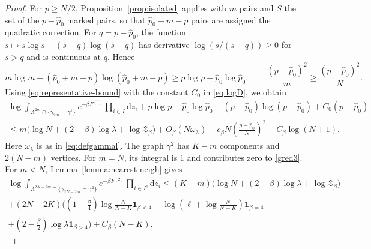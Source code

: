 \documentclass[a4paper,10pt,leqno]{amsart}
\numberwithin{equation}{section}
\newcommand{\dd}{\mathrm{d}}
\def\mc{\mathcal}
\def\indic{\mathbf{1}}
\begin{document}
\begin{proof}
  For $p\ge N/2$, Proposition~\ref{prop:isolated} applies with $m$ pairs and $S$ the set of the $p-\widehat p_0$ marked pairs, so that $\widehat p_0+m-p$ pairs are assigned the quadratic correction. For $q=p-\widehat p_0$, the function $s\mapsto s\log s-(s-q)\log(s-q)$ has derivative $\log(s/(s-q))\ge0$ for $s>q$ and is continuous at $q$. Hence
  \[
    m\log m-(\widehat p_0+m-p)\log(\widehat p_0+m-p)\ge p\log p-\widehat p_0\log \widehat p_0,
    \qquad
    \frac{(p-\widehat p_0)^2}{m}\ge\frac{(p-\widehat p_0)^2}{N}.
  \]
  Using \eqref{eq:representative-bound} with the constant $C_0$ in \eqref{eq:logD}, we obtain
  \begin{multline}\label{eq:F(1)}
    \log\int_{\Lambda^{2m}\cap\{\gamma_{2m}=\gamma^1\}}e^{-\beta F^{(1)}}\prod_{i\in I}\dd z_i
    +p\log p-\widehat p_0\log \widehat p_0-(p-\widehat p_0)\log(p-\widehat p_0)+C_0(p-\widehat p_0)\\
    \le m\bigl(\log N+(2-\beta)\log\lambda+\log\mc Z_\beta\bigr)
    +O_\beta(N\omega_\lambda)-c_\beta N\left(\frac{p-\widehat p_0}{N}\right)^2+C_\beta\log(N+1).
  \end{multline}
  Here $\omega_\lambda$ is as in \eqref{eq:defgammal}. The graph $\gamma^2$ has $K-m$ components and $2(N-m)$ vertices. For $m=N$, its integral is $1$ and contributes zero to \eqref{gred3}. For $m<N$, Lemma~\ref{lemma:nearest neigh} gives
  \begin{multline}\label{eq:F(2)}
    \log\int_{\Lambda^{2N-2m}\cap\{\gamma_{2N-2m}=\gamma^2\}}e^{-\beta F^{(2)}}\prod_{i\in I^c}\dd z_i
    \le(K-m)\bigl(\log N+(2-\beta)\log\lambda+\log\mc Z_\beta\bigr)\\
    +(2N-2K)\Bigg(\left(1-\frac\beta4\right)\log\frac{N}{N-K}\indic_{\beta<4}
    +\log\left(\ell+\log\frac{N}{N-K}\right)\indic_{\beta=4}\\
    +\left(2-\frac\beta2\right)\log\lambda\indic_{\beta>4}\Bigg)+C_\beta(N-K).
  \end{multline}


\end{proof}
\end{document}
